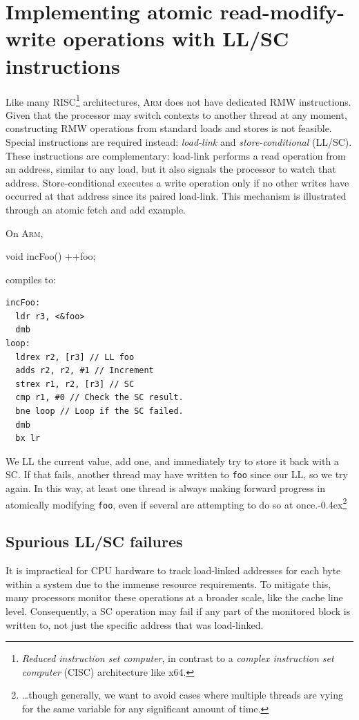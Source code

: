 \documentclass[fontsize=10pt, oneside]{scrartcl}
\newcommand{\punckern}{\kern-0.4ex}
\newcommand{\introduce}[1]{\textit{#1}}
\begin{document}
\section{Implementing atomic read-modify-write operations with LL/SC instructions}

Like many \textsc{RISC}\footnote{%
\introduce{Reduced instruction set computer}, in contrast to a \introduce{complex instruction set computer} (\textsc{CISC}) architecture like x64.
} architectures, \textsc{Arm} does not have dedicated \textsc{RMW} instructions.
Given that the processor may switch contexts to another thread at any moment,
constructing \textsc{RMW} operations from standard loads and stores is not feasible.
Special instructions are required instead: \introduce{load-link} and \introduce{store-conditional} (\textsc{LL/SC}).
These instructions are complementary:
load-link performs a read operation from an address, similar to any load,
but it also signals the processor to watch that address.
Store-conditional executes a write operation only if no other writes have occurred at that address since its paired load-link.
This mechanism is illustrated through an atomic fetch and add example.

On \textsc{Arm},
\begin{ccode}
void incFoo() { ++foo; }
\end{ccode}
compiles to:
\begin{lstlisting}[language={[ARM]Assembler}]
incFoo:
  ldr r3, <&foo>
  dmb
loop:
  ldrex r2, [r3] // LL foo
  adds r2, r2, #1 // Increment
  strex r1, r2, [r3] // SC
  cmp r1, #0 // Check the SC result.
  bne loop // Loop if the SC failed.
  dmb
  bx lr
\end{lstlisting}
We \textsc{LL} the current value, add one, and immediately try to store it back with a \textsc{SC}.
If that fails, another thread may have written to \texttt{foo} since our \textsc{LL}, so we try again.
In this way, at least one thread is always making forward progress in atomically modifying \texttt{foo},
even if several are attempting to do so at once.\punckern\footnote{%
\ldots though generally,
we want to avoid cases where multiple threads are vying for the same variable for any significant amount of time.}

\subsection{Spurious LL/SC failures}
\label{spurious-llsc-failures}

It is impractical for \textsc{CPU} hardware to track load-linked addresses for each byte within a system due to the immense resource requirements.
To mitigate this, many processors monitor these operations at a broader scale, like the cache line level.
Consequently, a \textsc{SC} operation may fail if any part of the monitored block is written to,
not just the specific address that was load-linked.
\end{document}
